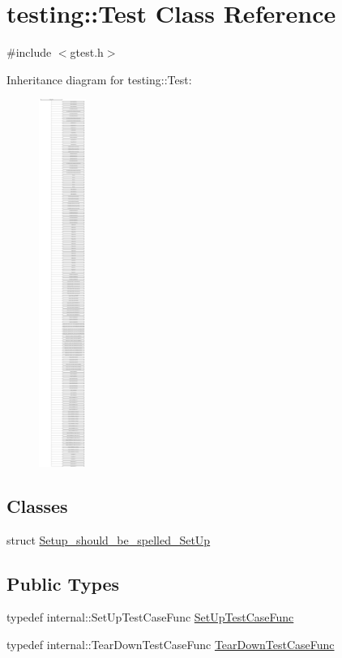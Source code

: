 \hypertarget{classtesting_1_1_test}{}\section{testing\+::Test Class Reference}
\label{classtesting_1_1_test}


{\ttfamily \#include $<$gtest.\+h$>$}

Inheritance diagram for testing\+::Test\+:\begin{figure}[H]
\begin{center}
\leavevmode
\includegraphics[height=12.000000cm]{df/d69/classtesting_1_1_test}
\end{center}
\end{figure}
\subsection*{Classes}
\begin{DoxyCompactItemize}
\item 
struct \mbox{\hyperlink{structtesting_1_1_test_1_1_setup__should__be__spelled___set_up}{Setup\+\_\+should\+\_\+be\+\_\+spelled\+\_\+\+Set\+Up}}
\end{DoxyCompactItemize}
\subsection*{Public Types}
\begin{DoxyCompactItemize}
\item 
typedef internal\+::\+Set\+Up\+Test\+Case\+Func \mbox{\hyperlink{classtesting_1_1_test_a5f2a051d1d99c9b784c666c586186cf9}{Set\+Up\+Test\+Case\+Func}}
\item 
typedef internal\+::\+Tear\+Down\+Test\+Case\+Func \mbox{\hyperlink{classtesting_1_1_test_aa0f532e93b9f3500144c53f31466976c}{Tear\+Down\+Test\+Case\+Func}}
\end{DoxyCompactItemize}
